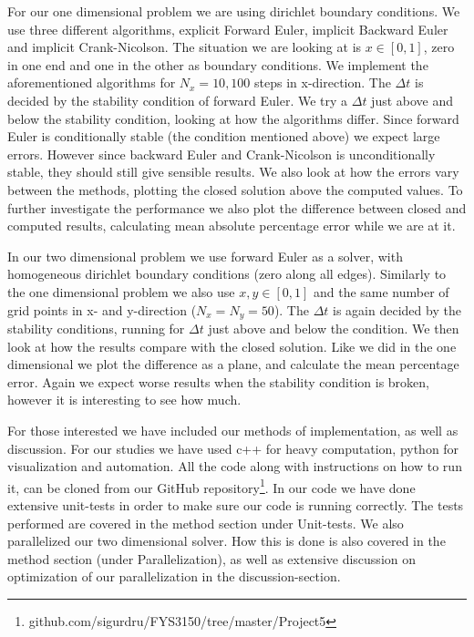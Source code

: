 \documentclass[reprint, english,notitlepage,nofootinbib]{revtex4-1}  %
\begin{document}
For our one dimensional problem we are using dirichlet boundary conditions. We use three different algorithms, explicit Forward Euler, implicit Backward Euler and implicit Crank-Nicolson. The situation we are looking at is $x\in[0,1]$, zero in one end and one in the other as boundary conditions. We implement the aforementioned algorithms for $N_x = 10, 100$ steps in x-direction. The $\Delta t$ is decided by the stability condition of forward Euler. We try a $\Delta t$ just above and below the stability condition, looking at how the algorithms differ. Since forward Euler is conditionally stable (the condition mentioned above) we expect large errors. However since backward Euler and Crank-Nicolson is unconditionally stable, they should still give sensible results. We also look at how the errors vary between the methods, plotting the closed solution above the computed values. To further investigate the performance we also plot the difference between closed and computed results, calculating mean absolute percentage error while we are at it.

In our two dimensional problem we use forward Euler as a solver, with homogeneous dirichlet boundary conditions (zero along all edges). Similarly to the one dimensional problem we also use $x,y\in [0,1]$ and the same number of grid points in x- and y-direction ($N_x = N_y = 50$). The $\Delta t$ is again decided by the stability conditions, running for $\Delta t$ just above and below the condition. We then look at how the results compare with the closed solution. Like we did in the one dimensional we plot the difference as a plane, and calculate the mean percentage error. Again we expect worse results when the stability condition is broken, however it is interesting to see how much. 

For those interested we have included our methods of implementation, as well as discussion. For our studies we have used c++ for heavy computation, python for visualization and automation. All the code along with instructions on how to run it, can be cloned from our GitHub repository\footnote{github.com/sigurdru/FYS3150/tree/master/Project5}. In our code we have done extensive unit-tests in order to make sure our code is running correctly. The tests performed are covered in the method section under Unit-tests. We also parallelized our two dimensional solver. How this is done is also covered in the method section (under Parallelization), as well as extensive discussion on optimization of our parallelization in the discussion-section.
\end{document}
